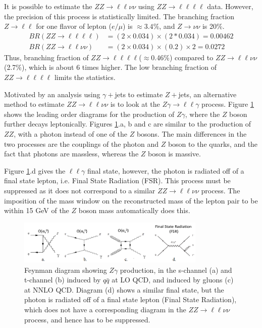 \documentclass[12pt,a4paper,openright,twoside]{report}
\newcommand{\ZZ}{$ZZ\to \ell\ell\nu\nu$ }
\newcommand{\Zg}{$Z\gamma\to \ell\ell\gamma$ }
\begin{document}
It is possible to estimate the \ZZ using $ZZ\to \ell\ell\ell\ell$ data. However, the precision of this process is statistically limited. The branching fraction $Z\to\ell\ell$ for one flavor of lepton ($e/\mu$) is $\approx 3.4\%$, and $Z\to\nu\nu$ is 20\%. 
\begin{align}
BR(ZZ\to \ell\ell\ell\ell) &= (2\times 0.034)\times(2*0.034) = 0.00462\\
BR(ZZ\to \ell\ell\nu\nu) &= (2\times 0.034)\times(0.2)\times 2 = 0.0272
\end{align}
Thus, branching fraction of $ZZ\to \ell\ell\ell\ell$($\approx$0.46\%) compared to \ZZ (2.7\%), which is about 6 times higher. The low branching fraction of $ZZ\to \ell\ell\ell\ell$ limits the statistics.

Motivated by an analysis using $\gamma+$jets to estimate $Z+$jets\cite{gamma_jet}, an alternative method to estimate \ZZ is to look at the \Zg process. Figure \ref{fig:Zg} shows the leading order diagrams for the production of $Z\gamma$, where the $Z$ boson further decays leptonically. Figures \ref{fig:Zg}.a, b and c are similar to the production of $ZZ$, with a photon instead of one of the $Z$ bosons. The main differences in the two processes are the couplings of the photon and $Z$ boson to the quarks, and the fact that photons are massless, whereas the $Z$ boson is massive. 

Figure \ref{fig:Zg}.d gives the $\ell\ell\gamma$ final state, however, the photon is radiated off of a final state lepton, i.e. Final State Radiation (FSR). This process must be suppressed as it does not correspond to a similar \ZZ process. The imposition of the mass window on the reconstructed mass of the lepton pair to be within 15 GeV of the $Z$ boson mass automatically does this.

\begin{figure}[H]
\centering
		\includegraphics[width=0.8\textwidth]{Zg.png}
		\caption{Feynman diagram showing $Z\gamma$ production, in the s-channel (a) and t-channel (b) induced by $q\bar{q}$ at LO QCD, and induced by gluons (c) at NNLO QCD. Diagram (d) shows a similar final state, but the photon is radiated off of a final state lepton (Final State Radiation), which does not have a corresponding diagram in the \ZZ process, and hence has to be suppressed.}
		\label{fig:Zg}
\end{figure}
\end{document}
